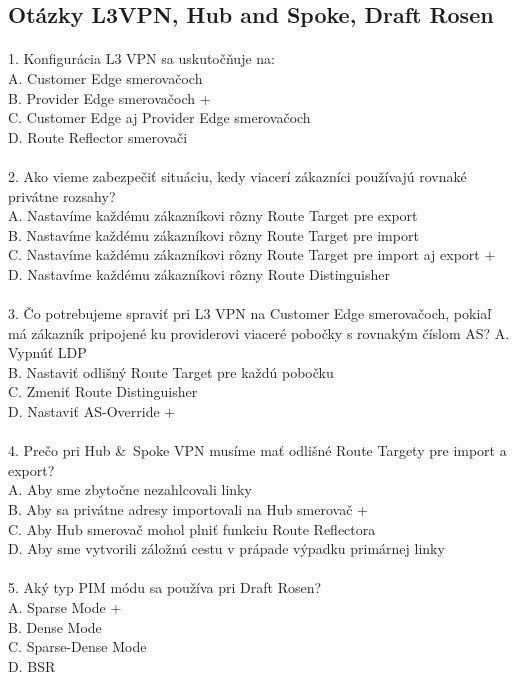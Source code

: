 \documentclass[12pt,twoside,a4paper]{report}
\begin{document}
\subsection{Otázky L3VPN, Hub and Spoke, Draft Rosen}
\paragraph{}
1. Konfigurácia L3 VPN sa uskutočňuje na:\\
A. Customer Edge smerovačoch\\
B. Provider Edge smerovačoch +\\
C. Customer Edge aj Provider Edge smerovačoch\\
D. Route Reflector smerovači\\

\paragraph{}
2. Ako vieme zabezpečiť situáciu, kedy viacerí zákazníci používajú rovnaké privátne rozsahy?\\
A. Nastavíme každému zákazníkovi rôzny Route Target pre export\\
B. Nastavíme každému zákazníkovi rôzny Route Target pre import\\
C. Nastavíme každému zákazníkovi rôzny Route Target pre import aj export +\\
D. Nastavíme každému zákazníkovi rôzny Route Distinguisher\\

\paragraph{}
3. Čo potrebujeme spraviť pri L3 VPN na Customer Edge smerovačoch, pokiaľ má zákazník pripojené ku providerovi viaceré pobočky s rovnakým číslom AS?
A. Vypnúť LDP\\
B. Nastaviť odlišný Route Target pre každú pobočku\\
C. Zmeniť Route Distinguisher\\
D. Nastaviť AS-Override +\\

\paragraph{}
4. Prečo pri Hub \& Spoke VPN musíme mať odlišné Route Targety pre import a export?\\
A. Aby sme zbytočne nezahlcovali linky\\
B. Aby sa privátne adresy importovali na Hub smerovač +\\
C. Aby Hub smerovač mohol plniť funkciu Route Reflectora\\
D. Aby sme vytvorili záložnú cestu v prápade výpadku primárnej linky\\

\paragraph{}
5. Aký typ PIM módu sa používa pri Draft Rosen?\\
A. Sparse Mode +\\
B. Dense Mode\\
C. Sparse-Dense Mode\\
D. BSR\\
\end{document}
